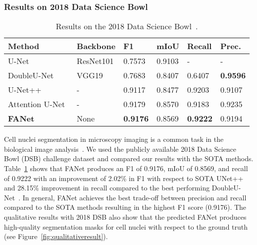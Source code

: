 \documentclass[journal]{IEEEtran}
\begin{document}
\subsubsection{Results on 2018 Data Science Bowl} 
\begin{table}[!t]
\footnotesize
\centering
\caption{Results on the 2018 Data Science Bowl~\cite{caicedo2019nucleus}.}
\begin{tabular}{@{}l|l|l|l|l|l@{}}
\toprule
\textbf{Method} &\textbf{Backbone} & \textbf{F1}  & \textbf{mIoU} &\textbf{Recall}& \textbf{Prec.} \\
\midrule
U-Net~\cite{ronneberger2015u} & ResNet101  & 0.7573 & 0.9103 & - & -  \\ DoubleU-Net~\cite{jha2020doubleu} & VGG19  & 0.7683 & 0.8407 & 0.6407 & \textbf{0.9596}  \\
U-Net++~\cite{zhou2018unet++} & - &0.9117 &0.8477 &0.9203 &0.9107  \\ Attention U-Net~\cite{oktay2018attention} & - &0.9179 &0.8570 &0.9183 &0.9235  \\ \textbf{FANet} & None  &\textbf{0.9176}& 0.8569 & \textbf{0.9222} & 0.9194\\ \bottomrule
\end{tabular}
\label{tab:DSB}
\end{table}
Cell nuclei segmentation in microscopy imaging is a common task in the biological image analysis~\cite{caicedo2019nucleus}. We used the publicly available 2018 Data Science Bowl (DSB) challenge dataset and compared our results with the \ac{SOTA} methods. Table~\ref{tab:DSB} shows that FANet produces an F1 of 0.9176, \ac{mIoU} of 0.8569, and recall of 0.9222 with an improvement of 2.02\% in F1 with respect to \ac{SOTA} UNet++~\cite{zhou2019unet++} and 28.15\% improvement in recall compared to the best performing DoubleU-Net~\cite{jha2020doubleu}. In general, FANet achieves the best trade-off between precision and recall compared to the \ac{SOTA} methods resulting in the highest F1 score (0.9176). The qualitative results with 2018 DSB also show that the predicted FANet produces high-quality segmentation masks for cell nuclei with respect to the ground truth (see Figure~\ref{fig:qualitativeresult}). 
\end{document}
